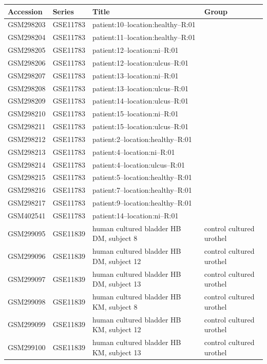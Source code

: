 \begin{longtable}{llp{}l}
\hline\hline Accession & Series & Title & Group \\
\hline\endhead
GSM298203 & GSE11783 & patient:10--location:healthy--R:01 &  \\
GSM298204 & GSE11783 & patient:11--location:healthy--R:01 &  \\
GSM298205 & GSE11783 & patient:12--location:ni--R:01 &  \\
GSM298206 & GSE11783 & patient:12--location:ulcus--R:01 &  \\
GSM298207 & GSE11783 & patient:13--location:ni--R:01 &  \\
GSM298208 & GSE11783 & patient:13--location:ulcus--R:01 &  \\
GSM298209 & GSE11783 & patient:14--location:ulcus--R:01 &  \\
GSM298210 & GSE11783 & patient:15--location:ni--R:01 &  \\
GSM298211 & GSE11783 & patient:15--location:ulcus--R:01 &  \\
GSM298212 & GSE11783 & patient:2--location:healthy--R:01 &  \\
GSM298213 & GSE11783 & patient:4--location:ni--R:01 &  \\
GSM298214 & GSE11783 & patient:4--location:ulcus--R:01 &  \\
GSM298215 & GSE11783 & patient:5--location:healthy--R:01 &  \\
GSM298216 & GSE11783 & patient:7--location:healthy--R:01 &  \\
GSM298217 & GSE11783 & patient:9--location:healthy--R:01 &  \\
GSM402541 & GSE11783 & patient:14--location:ni--R:01 &  \\
GSM299095 & GSE11839 & human cultured bladder HB DM, subject 8 & control cultured urothel \\
GSM299096 & GSE11839 & human cultured bladder HB DM, subject 12 & control cultured urothel \\
GSM299097 & GSE11839 & human cultured bladder HB DM, subject 13 & control cultured urothel \\
GSM299098 & GSE11839 & human cultured bladder HB KM, subject 8 & control cultured urothel \\
GSM299099 & GSE11839 & human cultured bladder HB KM, subject 12 & control cultured urothel \\
GSM299100 & GSE11839 & human cultured bladder HB KM, subject 13 & control cultured urothel \\

\end{longtable}
